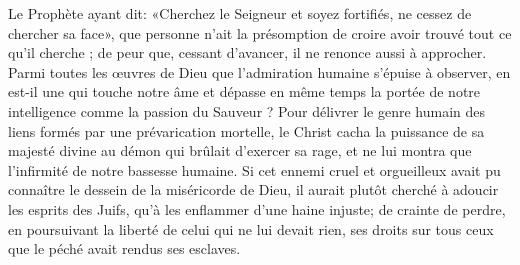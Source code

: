 Le Prophète ayant dit:
	«Cherchez le Seigneur et soyez fortifiés, ne cessez de chercher sa face»,
	que personne n’ait la présomption
		de croire avoir trouvé tout ce qu’il cherche ;
	de peur que, cessant d’avancer, il ne renonce aussi à approcher.
Parmi toutes les œuvres de Dieu que l’admiration humaine s’épuise à observer,
	en est-il une qui touche notre âme
	et dépasse en même temps la portée de notre intelligence
	comme la passion du Sauveur ?
Pour délivrer le genre humain des liens formés par une prévarication mortelle,
	le Christ cacha la puissance de sa majesté divine
	au démon qui brûlait d’exercer sa rage,
	et ne lui montra que l’infirmité de notre bassesse humaine.
Si cet ennemi cruel et orgueilleux
	avait pu connaître le dessein de la miséricorde de Dieu,
	il aurait plutôt cherché à adoucir les esprits des Juifs,
	qu’à les enflammer d’une haine injuste;
	de crainte de perdre,
		en poursuivant la liberté de celui qui ne lui devait rien,
	ses droits sur tous ceux que le péché avait rendus ses esclaves.
